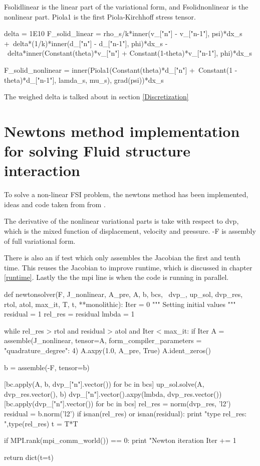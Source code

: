 Fsolidlinear is the linear part of the variational form, and Fsolidnonlinear is the nonlinear part.
Piola1 is the first Piola-Kirchhoff stress tensor.
\begin{python}
delta = 1E10
F_solid_linear = rho_s/k*inner(v_["n"] - v_["n-1"], psi)*dx_s +\
delta*(1/k)*inner(d_["n"] - d_["n-1"], phi)*dx_s -\
delta*inner(Constant(theta)*v_["n"] + Constant(1-theta)*v_["n-1"], phi)*dx_s

F_solid_nonlinear = inner(Piola1(Constant(theta)*d_["n"] +\
Constant(1 - theta)*d_["n-1"], lamda_s, mu_s), grad(psi))*dx_s
\end{python}

The weighed delta is talked about in section \ref{Discretization}

\section{Newtons method implementation for solving Fluid structure interaction}
To solve a non-linear FSI problem, the newtons method has been implemented, ideas and code taken from from \cite{White2006}.

The derivative of the nonlinear variational parts is take with respect to dvp, which is the mixed function of displacement, velocity and pressure. -F is assembly of full variational form.


There is also an if test which only assembles the Jacobian the first and tenth time. This reuses the Jacobian to improve runtime, which is discussed in chapter \ref{runtime}. Lastly the the mpi line is when the code is running in parallel.
\begin{python}
def newtonsolver(F, J_nonlinear, A_pre, A, b, bcs, \
                dvp_, up_sol, dvp_res, rtol, atol, max_it, T, t, **monolithic):
    Iter      = 0  """ Setting initial values """
    residual   = 1  
    rel_res    = residual
    lmbda = 1

    while rel_res > rtol and residual > atol and Iter < max_it:
        if Iter %
            A = assemble(J_nonlinear, tensor=A, form_compiler_parameters = {"quadrature_degree": 4})
            A.axpy(1.0, A_pre, True)
            A.ident_zeros()

        b = assemble(-F, tensor=b)

        [bc.apply(A, b, dvp_["n"].vector()) for bc in bcs]
        up_sol.solve(A, dvp_res.vector(), b)
        dvp_["n"].vector().axpy(lmbda, dvp_res.vector())
        [bc.apply(dvp_["n"].vector()) for bc in bcs]
        rel_res = norm(dvp_res, 'l2')
        residual = b.norm('l2')
        if isnan(rel_res) or isnan(residual):
            print "type rel_res: ",type(rel_res)
            t = T*T

        if MPI.rank(mpi_comm_world()) == 0:
            print "Newton iteration %
        Iter += 1

    return dict(t=t)
\end{python}




	